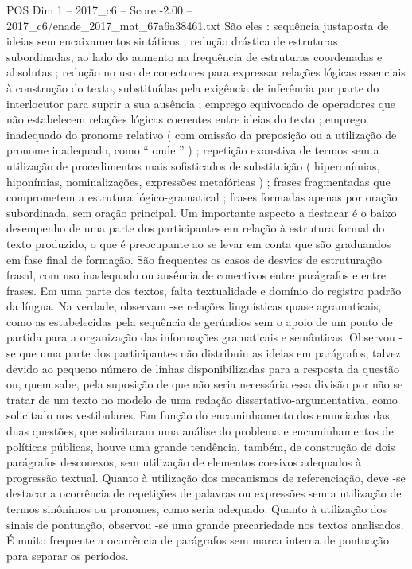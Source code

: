 \begin{textsample}{POS Dim 1 – 2017\_c6 – Score -2.00 – 2017\_c6/enade\_2017\_mat\_67a6a38461.txt}
São eles : sequência justaposta de ideias sem encaixamentos sintáticos ; redução drástica de estruturas subordinadas, ao lado do aumento na frequência de estruturas coordenadas e absolutas ; redução no uso de conectores para expressar relações lógicas essenciais à construção do texto, substituídas pela exigência de inferência por parte do interlocutor para suprir a sua ausência ; emprego equivocado de operadores que não estabelecem relações lógicas coerentes entre ideias do texto ; emprego inadequado do pronome relativo ( com omissão da preposição ou a utilização de pronome inadequado, como “ onde ” ) ; repetição exaustiva de termos sem a utilização de procedimentos mais sofisticados de substituição ( hiperonímias, hiponímias, nominalizações, expressões metafóricas ) ; frases fragmentadas que comprometem a estrutura lógico-gramatical ; frases formadas apenas por oração subordinada, sem oração principal.
Um importante aspecto a destacar é o baixo desempenho de uma parte dos participantes em relação à estrutura formal do texto produzido, o que é preocupante ao se levar em conta que são graduandos em fase final de formação.
São frequentes os casos de desvios de estruturação frasal, com uso inadequado ou ausência de conectivos entre parágrafos e entre frases.
Em uma parte dos textos, falta textualidade e domínio do registro padrão da língua.
Na verdade, observam -se relações linguísticas quase agramaticais, como as estabelecidas pela sequência de gerúndios sem o apoio de um ponto de partida para a organização das informações gramaticais e semânticas.
Observou -se que uma parte dos participantes não distribuiu as ideias em parágrafos, talvez devido ao pequeno número de linhas disponibilizadas para a resposta da questão ou, quem sabe, pela suposição de que não seria necessária essa divisão por não se tratar de um texto no modelo de uma redação dissertativo-argumentativa, como solicitado nos vestibulares.
Em função do encaminhamento dos enunciados das duas questões, que solicitaram uma análise do problema e encaminhamentos de políticas públicas, houve uma grande tendência, também, de construção de dois parágrafos desconexos, sem utilização de elementos coesivos adequados à progressão textual.
Quanto à utilização dos mecanismos de referenciação, deve -se destacar a ocorrência de repetições de palavras ou expressões sem a utilização de termos sinônimos ou pronomes, como seria adequado.
Quanto à utilização dos sinais de pontuação, observou -se uma grande precariedade nos textos analisados.
É muito frequente a ocorrência de parágrafos sem marca interna de pontuação para separar os períodos.

\end{textsample}
